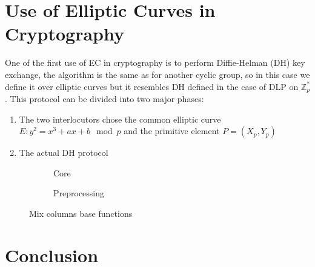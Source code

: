 \documentclass{article}
\begin{document}

\section{Use of Elliptic Curves in Cryptography}

One of the first use of EC in cryptography is to perform Diffie-Helman (DH) key exchange, the algorithm is the same as for another cyclic group, so in this case we define it over elliptic curves but it resembles DH defined in the case of DLP on $\mathbb{Z}_p^*$.\newline
This protocol can be divided into two major phases:
\begin{enumerate}
	\item The two interlocutors chose the common elliptic curve $E: y^2 = x^3 + ax+ b \mod p$ and the primitive element $P = (X_p, Y_p)$
	\item The actual DH protocol
\end{enumerate} 


\begin{figure}[H]
	\centering
	\begin{subfigure}{.54\textwidth}
		\centering
		\caption{Core}
		\label{fig:core}
	\end{subfigure}
	\begin{subfigure}{.35\textwidth}
		\centering
		\caption{Preprocessing}
		\label{fig:preprocessing}
	\end{subfigure}
	\caption{Mix columns base functions}
	\label{fig:MixColumns}
\end{figure}


\section{Conclusion}






%

\end{document}
